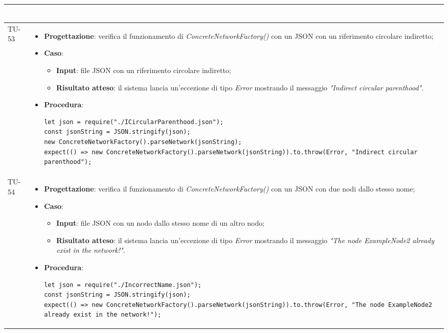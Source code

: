 \begin{longtable}{|C{1.5cm}|C{14.5cm}|}
\begin{itemize}
\begin{lstlisting}
		\end{lstlisting}
	\end{itemize}\\
	\hline
	{TU-53} &
	\begin{itemize}
		\item \textbf{Progettazione}: verifica il funzionamento di \emph{ConcreteNetworkFactory()} con un JSON con un riferimento circolare indiretto;
		\item \textbf{Caso}: 
		\begin{itemize}
			\item \textbf{Input}: file JSON con un riferimento circolare indiretto;
			\item \textbf{Risultato atteso}: il sistema lancia un'eccezione di tipo \emph{Error} mostrando il messaggio \emph{"Indirect circular parenthood"}.
		\end{itemize}
		\item \textbf{Procedura}:
		\begin{lstlisting}
let json = require("./ICircularParenthood.json");
const jsonString = JSON.stringify(json);
new ConcreteNetworkFactory().parseNetwork(jsonString);
expect(() => new ConcreteNetworkFactory().parseNetwork(jsonString)).to.throw(Error, "Indirect circular parenthood");
		\end{lstlisting}
	\end{itemize}\\
	\hline
	{TU-54} &
	\begin{itemize}
		\item \textbf{Progettazione}: verifica il funzionamento di \emph{ConcreteNetworkFactory()} con un JSON con due nodi dallo stesso nome;
		\item \textbf{Caso}: 
		\begin{itemize}
			\item \textbf{Input}: file JSON con un nodo dallo stesso nome di un altro nodo;
			\item \textbf{Risultato atteso}: il sistema lancia un'eccezione di tipo \emph{Error} mostrando il messaggio \emph{"The node ExampleNode2 already exist in the network!"}.
		\end{itemize}
		\item \textbf{Procedura}:
		\begin{lstlisting}
let json = require("./IncorrectName.json");
const jsonString = JSON.stringify(json);
expect(() => new ConcreteNetworkFactory().parseNetwork(jsonString)).to.throw(Error, "The node ExampleNode2 already exist in the network!");
		\end{lstlisting}

\end{itemize}
\end{longtable}

